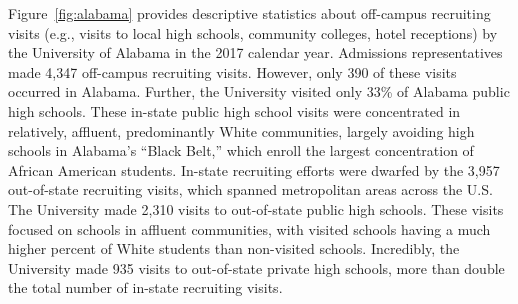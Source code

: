 \documentclass[twoside]{article}
\begin{document}
Figure~\ref{fig:alabama} provides descriptive statistics about off-campus recruiting visits (e.g., visits to local high schools, community colleges, hotel receptions) by the University of Alabama in the 2017 calendar year.  Admissions representatives made 4,347 off-campus recruiting visits.  However, only 390 of these visits occurred in Alabama.  Further, the University visited only 33\% of Alabama public high schools. These in-state public high school visits were concentrated in relatively, affluent, predominantly White communities, largely avoiding high schools in Alabama's ``Black Belt,'' which enroll the largest concentration of African American students.  In-state recruiting efforts were dwarfed by the 3,957 out-of-state recruiting visits, which spanned metropolitan areas across the U.S. The University made 2,310 visits to out-of-state public high schools. These visits focused on schools in affluent communities, with visited schools having a much higher percent of White students than non-visited schools.  Incredibly, the University made 935 visits to out-of-state private high schools, more than double the total number of in-state recruiting visits.

\end{document}
